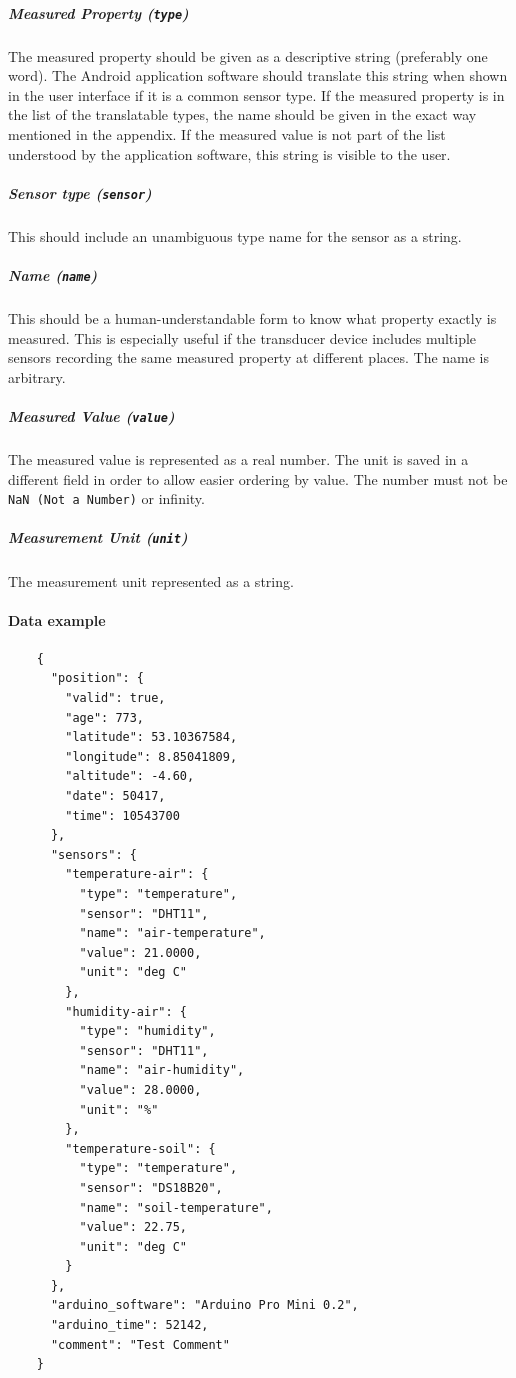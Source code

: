 \subparagraph{Measured Property (\texttt{type})}
The measured property should be given as a descriptive string (preferably one word). The Android application software should translate this string when shown in the user interface if it is a common sensor type. If the measured property is in the list of the translatable types, the name should be given in the exact way mentioned in the appendix. If the measured value is not part of the list understood by the application software, this string is visible to the user. 

\subparagraph{Sensor type (\texttt{sensor})}
This should include an unambiguous type name for the sensor as a string.

\subparagraph{Name (\texttt{name})}
This should be a human-understandable form to know what property exactly is measured. This is especially useful if the transducer device includes multiple sensors recording the same measured property at different places. The name is arbitrary.

\subparagraph{Measured Value (\texttt{value})}
The measured value is represented as a real number. The unit is saved in a different field in order to allow easier ordering by value. The number must not be \texttt{NaN (Not a Number)} or infinity.

\subparagraph{Measurement Unit (\texttt{unit})}
The measurement unit represented as a string.

\paragraph{Data example}

\begin{verbatim}
	{
	  "position": {
	    "valid": true,
	    "age": 773,
	    "latitude": 53.10367584,
	    "longitude": 8.85041809,
	    "altitude": -4.60,
	    "date": 50417,
	    "time": 10543700
	  },
	  "sensors": {
	    "temperature-air": {
	      "type": "temperature",
	      "sensor": "DHT11",
	      "name": "air-temperature",
	      "value": 21.0000,
	      "unit": "deg C"
	    },
	    "humidity-air": {
	      "type": "humidity",
	      "sensor": "DHT11",
	      "name": "air-humidity",
	      "value": 28.0000,
	      "unit": "%"
	    },
	    "temperature-soil": {
	      "type": "temperature",
	      "sensor": "DS18B20",
	      "name": "soil-temperature",
	      "value": 22.75,
	      "unit": "deg C"
	    }
	  },
	  "arduino_software": "Arduino Pro Mini 0.2",
	  "arduino_time": 52142,
	  "comment": "Test Comment"
	}
\end{verbatim}

